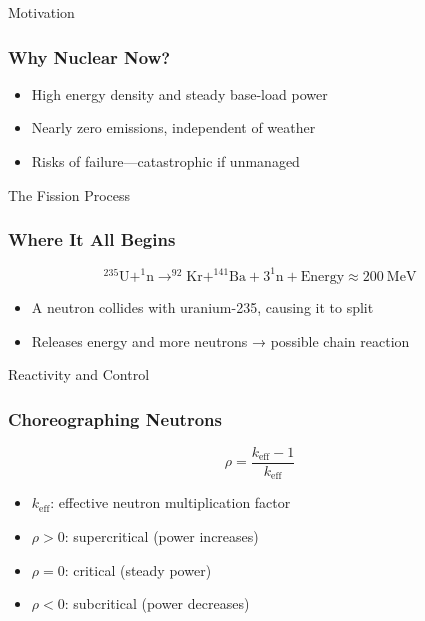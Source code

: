 \documentclass{beamer}
\begin{document}
\begin{frame}{Motivation}
  \subsubsection*{Why Nuclear Now?}
  \begin{itemize}
    \item High energy density and steady base-load power
    \item Nearly zero emissions, independent of weather
    \item Risks of failure—catastrophic if unmanaged
  \end{itemize}
\end{frame}

\begin{frame}{The Fission Process}
  \subsubsection*{Where It All Begins}
  \begin{equation}
    ^{235}\text{U} + ^{1}\text{n} \rightarrow ^{92}\text{Kr} + ^{141}\text{Ba} + 3^{1}\text{n} + \text{Energy} \approx 200~\text{MeV}
  \end{equation}
  \begin{itemize}
    \item A neutron collides with uranium-235, causing it to split
    \item Releases energy and more neutrons → possible chain reaction
  \end{itemize}
\end{frame}

\begin{frame}{Reactivity and Control}
  \subsubsection*{Choreographing Neutrons}
  \begin{equation}
    \rho = \frac{k_{\text{eff}} - 1}{k_{\text{eff}}}
  \end{equation}
  \begin{itemize}
    \item $k_{\text{eff}}$: effective neutron multiplication factor
    \item $\rho > 0$: supercritical (power increases)
    \item $\rho = 0$: critical (steady power)
    \item $\rho < 0$: subcritical (power decreases)
  \end{itemize}
\end{frame}
\end{document}
